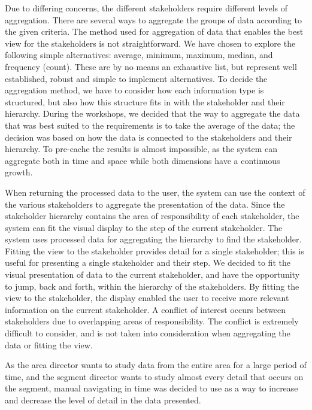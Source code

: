 Due to differing concerns, the different stakeholders 
require different levels of aggregation. There are several ways to 
aggregate the groups of data according to the given criteria. The method used 
for aggregation of data that enables the best view for the stakeholders is not 
straightforward. We have chosen to explore the following simple alternatives: 
average, minimum, maximum, median, and frequency (count). These are by no 
means an exhaustive list, but represent well established, robust and simple to 
implement alternatives. To decide the aggregation method, we have to consider 
how each information type is structured, but also how this structure fits in 
with the stakeholder and their hierarchy. During the workshops, we decided 
that the way to aggregate the data that was best suited to the requirements is 
to take the average of the data; the decision was based on how the data is connected to 
the stakeholders and their hierarchy. To pre-cache the results is almost 
impossible, as the system can aggregate both in time and space while both 
dimensions have a continuous growth.

When returning the processed data to the user, the system can use the 
context of the various stakeholders to aggregate the presentation of the data. 
Since the stakeholder hierarchy contains the area of responsibility of each 
stakeholder, the system can fit the visual display to the step of the current 
stakeholder. The system uses processed data for aggregating the hierarchy to 
find the stakeholder. Fitting the view to the stakeholder provides detail for 
a single stakeholder; this is useful for presenting a single stakeholder and 
their step.
We decided to fit the visual presentation of data 
to the current stakeholder, and have the opportunity to jump, back and forth, 
within the hierarchy of the stakeholders. By fitting the view to the 
stakeholder, the display enabled the user to receive more relevant information 
on the current stakeholder. A conflict of interest occurs between stakeholders 
due to overlapping areas of responsibility. The conflict is extremely difficult 
to consider, and is not taken into consideration when aggregating the data or 
fitting the view.

As the area director wants to study data from the entire area for a large 
period of time, and the segment director wants to study almost every detail 
that occurs on the segment, manual navigating in time was decided to use as a 
way to increase and decrease the level of detail in the data presented.

